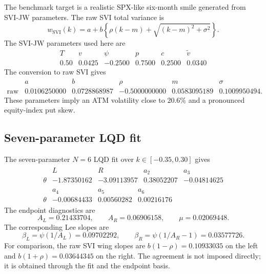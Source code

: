 \documentclass[11pt]{article}
\newcommand{\1}{\mathbf{1}}
\begin{document}
The benchmark target is a realistic SPX-like six-month smile generated from SVI-JW parameters.  The raw SVI total variance is
\begin{equation}
    w_{\mathrm{SVI}}(k)=a+b\left\{\rho(k-m)+\sqrt{(k-m)^2+\sigma^2}\right\}.\label{eq:raw_svi}
\end{equation}
The SVI-JW parameters used here are
\begin{equation}
\begin{array}{c|ccccc}
T & v & \psi & p & c & \widetilde v\\ \hline
0.50 & 0.0425 & -0.2500 & 0.7500 & 0.2500 & 0.0340
\end{array}
\end{equation}
The conversion to raw SVI gives
\begin{equation}
\begin{array}{c|ccccc}
 & a & b & \rho & m & \sigma\\ \hline
\text{raw SVI} & 0.0106250000 & 0.0728868987 & -0.5000000000 & 0.0583095189 & 0.1009950494.
\end{array}
\end{equation}
These parameters imply an ATM volatility close to $20.6\%$ and a pronounced equity-index put skew.

\subsection{Seven-parameter LQD fit}

The seven-parameter $N=6$ LQD fit over $k\in[-0.35,0.30]$ gives
\begin{equation}
\label{eq:svi_lqd_coeffs}
\begin{gathered}
\begin{array}{c|rrrr}
 & L & R & a_2 & a_3\\ \hline
\theta & -1.87350162 & -3.09113957 & 0.38052207 & -0.04814625
\end{array}\\[4pt]
\begin{array}{c|rrr}
 & a_4 & a_5 & a_6\\ \hline
\theta & -0.00684433 & 0.00560282 & 0.00216176
\end{array}
\end{gathered}
\end{equation}
The endpoint diagnostics are
\begin{equation}
    A_L=0.21433704,
    \qquad A_R=0.06906158,
    \qquad \mu=0.02069448.
\end{equation}
The corresponding Lee slopes are
\begin{equation}
    \beta_L=\psi(1/A_L)=0.09702292,
    \qquad
    \beta_R=\psi(1/A_R-1)=0.03577726.
\end{equation}
For comparison, the raw SVI wing slopes are $b(1-\rho)=0.10933035$ on the left and $b(1+\rho)=0.03644345$ on the right.  The agreement is not imposed directly; it is obtained through the fit and the endpoint basis.
\end{document}
